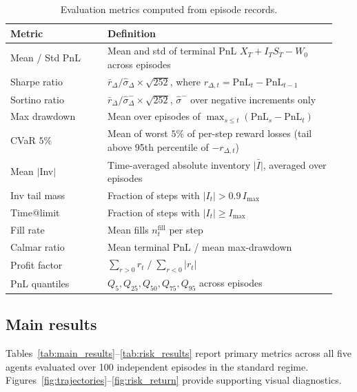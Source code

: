 \documentclass[11pt]{article}
\newcommand{\PnL}{\mathrm{PnL}}
\begin{document}
\begin{table}[H]
\centering
\caption{Evaluation metrics computed from episode records.}
\label{tab:metrics_def}
\small
\begin{tabular}{@{}p{0.28\linewidth}p{0.66\linewidth}@{}}
\toprule
Metric & Definition \\
\midrule
Mean / Std PnL    & Mean and std of terminal PnL $X_T + I_T S_T - W_0$ across episodes \\
Sharpe ratio      & $\bar{r}_{\Delta} / \hat\sigma_{\Delta} \times \sqrt{252}$,
                    where $r_{\Delta,t} = \PnL_t - \PnL_{t-1}$ \\
Sortino ratio     & $\bar{r}_{\Delta} / \hat\sigma^-_{\Delta} \times \sqrt{252}$,
                    $\hat\sigma^-$ over negative increments only \\
Max drawdown      & Mean over episodes of $\max_{s \le t}(\PnL_s - \PnL_t)$ \\
CVaR $5\%$        & Mean of worst $5\%$ of per-step reward losses
                    (tail above 95th percentile of $-r_{\Delta,t}$) \\
Mean $|$Inv$|$    & Time-averaged absolute inventory $\bar{|I|}$, averaged over episodes \\
Inv tail mass     & Fraction of steps with $|I_t| > 0.9\, I_{\max}$ \\
Time@limit        & Fraction of steps with $|I_t| \ge I_{\max}$ \\
Fill rate         & Mean fills $n^{\text{fill}}_t$ per step \\
Calmar ratio      & Mean terminal PnL / mean max-drawdown \\
Profit factor     & $\sum_{r>0} r_t \;/\; \sum_{r<0} |r_t|$ \\
PnL quantiles     & $Q_5, Q_{25}, Q_{50}, Q_{75}, Q_{95}$ across episodes \\
\bottomrule
\end{tabular}
\end{table}


\subsection{Main results}
\label{sec:main_results}

Tables~\ref{tab:main_results}--\ref{tab:risk_results} report primary
metrics across all five agents evaluated over 100 independent episodes
in the standard regime.
Figures~\ref{fig:trajectories}--\ref{fig:risk_return} provide
supporting visual diagnostics.
\end{document}
